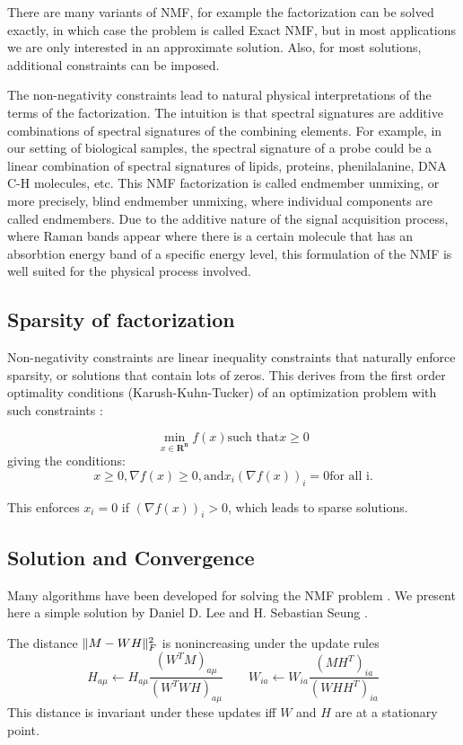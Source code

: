 There are many variants of NMF, for example the factorization can be solved exactly, in which case the problem is called Exact NMF, but in most applications we are only interested in an approximate solution. Also, for most solutions, additional constraints can be imposed.

The non-negativity constraints lead to natural physical interpretations of the terms of the factorization. The intuition is that spectral signatures are additive combinations of spectral signatures of the combining elements. For example, in our setting of biological samples, the spectral signature of a probe could be a linear combination of spectral signatures of lipids, proteins, phenilalanine, DNA C-H molecules, etc. This NMF factorization is called endmember unmixing, or more precisely, blind endmember unmixing, where individual components are called endmembers. Due to the additive nature of the signal acquisition process, where Raman bands appear where there is a certain molecule that has an absorbtion energy band of a specific energy level, this formulation of the NMF is well suited for the physical process involved.

\subsection*{Sparsity of factorization}

Non-negativity constraints are linear inequality constraints that naturally enforce sparsity, or solutions that contain lots of zeros. This derives from the first order optimality conditions (Karush-Kuhn-Tucker) of an optimization problem with such constraints \cite{Kuhn1951,Gillis2020}:

$$ \min_{x \in \mathbf{R^n}} f(x) \text{such that} x \ge 0 $$
giving the conditions:
$$ x \ge 0, \nabla f(x) \ge 0, \text{and} x_i(\nabla f(x))_i=0 \text{for all i.}$$

This enforces $x_i = 0$ if $(\nabla f(x))_i > 0$, which leads to sparse solutions.

\subsection*{Solution and Convergence}
Many algorithms have been developed for solving the NMF problem \cite{ChihJenLin2007,Xu2016,Lee2000}. We present here a simple solution by Daniel D. Lee and H. Sebastian Seung \cite{Lee2000}.

\begin{theorem}
    The distance $\lVert M-WH\rVert_F^2$ is nonincreasing under the update rules
    $$ H_{a \mu} \leftarrow H_{a \mu} \frac{(W^T M)_{a \mu}}{(W^T W H)_{a \mu}} \qquad
    W_{i a} \leftarrow W_{i a} \frac{(M H^T)_{i a}}{(W H H^T)_{i a}}$$
    This distance is invariant under these updates iff $W$ and $H$ are at a stationary point.
\end{theorem}

